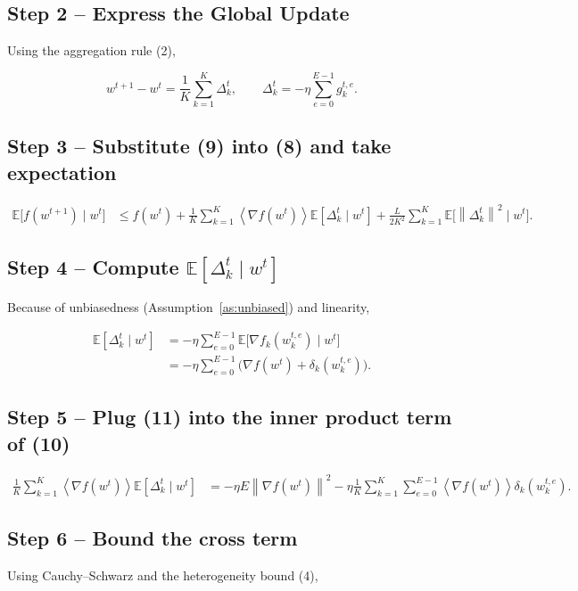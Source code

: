 \documentclass{article}
\newcommand{\E}{\mathbb{E}}
\newcommand{\norm}[1]{\left\|#1\right\|}
\newcommand{\inner}[1]{\left\langle #1 \right\rangle}
\begin{document}
\subsection*{Step 2 – Express the Global Update}
Using the aggregation rule (2),

\[
w^{t+1}-w^{t}= \frac1K\sum_{k=1}^{K}\Delta_{k}^{t},
\qquad 
\Delta_{k}^{t}= -\eta\sum_{e=0}^{E-1} g_{k}^{t,e}.
\tag{9}
\]

\subsection*{Step 3 – Substitute (9) into (8) and take expectation}
\[
\begin{aligned}
\E\bigl[f(w^{t+1})\mid w^{t}\bigr]
&\le f(w^{t})+\frac1K\sum_{k=1}^{K}
   \inner{\nabla f(w^{t})}{\E[\Delta_{k}^{t}\mid w^{t}]}
   +\frac{L}{2K^{2}}\sum_{k=1}^{K}\E\!\bigl[\norm{\Delta_{k}^{t}}^{2}\mid w^{t}\bigr].
\end{aligned}
\tag{10}
\]

\subsection*{Step 4 – Compute $\E[\Delta_{k}^{t}\mid w^{t}]$}
Because of unbiasedness (Assumption~\ref{as:unbiased}) and linearity,

\[
\begin{aligned}
\E[\Delta_{k}^{t}\mid w^{t}]
&= -\eta\sum_{e=0}^{E-1}\E\!\bigl[\nabla f_k(w_{k}^{t,e})\mid w^{t}\bigr] \\
&= -\eta\sum_{e=0}^{E-1}\bigl(\nabla f(w^{t})+\delta_k(w_{k}^{t,e})\bigr) .
\end{aligned}
\tag{11}
\]

\subsection*{Step 5 – Plug (11) into the inner product term of (10)}
\[
\begin{aligned}
\frac1K\sum_{k=1}^{K}\inner{\nabla f(w^{t})}{\E[\Delta_{k}^{t}\mid w^{t}]}
&= -\eta E \norm{\nabla f(w^{t})}^{2}
   -\eta\frac1K\sum_{k=1}^{K}\sum_{e=0}^{E-1}
      \inner{\nabla f(w^{t})}{\delta_k(w_{k}^{t,e})}.
\end{aligned}
\tag{12}
\]

\subsection*{Step 6 – Bound the cross term}
Using Cauchy–Schwarz and the heterogeneity bound (4),
\end{document}
